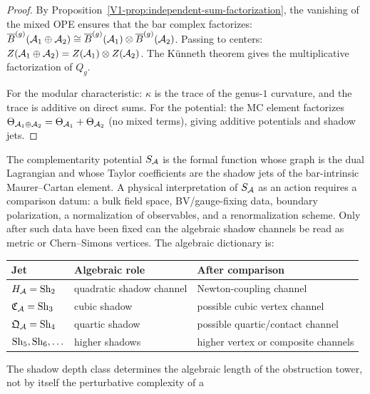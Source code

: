 \begin{proof}
By Proposition~\ref{V1-prop:independent-sum-factorization}, the
vanishing of the mixed OPE ensures that the bar complex
factorizes: $\overline{B}^{(g)}(\mathcal{A}_1 \oplus \mathcal{A}_2)
\cong \overline{B}^{(g)}(\mathcal{A}_1) \otimes \overline{B}^{(g)}(\mathcal{A}_2)$.
Passing to centers: $Z(\mathcal{A}_1 \oplus \mathcal{A}_2) = Z(\mathcal{A}_1)
\otimes Z(\mathcal{A}_2)$. The K\"{u}nneth theorem gives the
multiplicative factorization of $Q_g$.

For the modular characteristic: $\kappa$ is the trace of the
genus-$1$ curvature, and the trace is additive on direct sums.
For the potential: the MC element factorizes
$\Theta_{\mathcal{A}_1 \oplus \mathcal{A}_2} = \Theta_{\mathcal{A}_1} + \Theta_{\mathcal{A}_2}$
(no mixed terms), giving additive potentials and shadow jets.
\end{proof}

\begin{remark}
The complementarity potential $S_{\mathcal{A}}$ is the formal function whose
graph is the dual Lagrangian and whose Taylor coefficients are the
shadow jets of the bar-intrinsic Maurer--Cartan element.  A physical
interpretation of $S_{\mathcal{A}}$ as an action requires a comparison datum:
a bulk field space, BV/gauge-fixing data, boundary polarization, a
normalization of observables, and a renormalization scheme.  Only after
such data have been fixed can the algebraic shadow channels be read as
metric or Chern--Simons vertices.  The algebraic dictionary is:
\begin{center}
\renewcommand{\arraystretch}{1.2}
\begin{tabular}{l@{\quad}l@{\quad}l}
\textbf{Jet} & \textbf{Algebraic role} &
\textbf{After comparison} \\
\midrule
$H_{\mathcal{A}} = \mathrm{Sh}_2$ & quadratic shadow channel &
 Newton-coupling channel \\
$\mathfrak{C}_{\mathcal{A}} = \mathrm{Sh}_3$ & cubic shadow &
 possible cubic vertex channel \\
$\mathfrak{Q}_{\mathcal{A}} = \mathrm{Sh}_4$ & quartic shadow &
 possible quartic/contact channel \\
$\mathrm{Sh}_5, \mathrm{Sh}_6, \ldots$ & higher shadows &
 higher vertex or composite channels \\
\end{tabular}
\end{center}
The shadow depth class determines the algebraic length of the
obstruction tower, not by itself the perturbative complexity of a

\end{remark}
